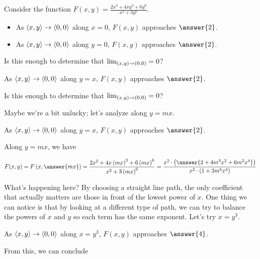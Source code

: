\documentclass{ximera}
\author{Jim Talamo}
\begin{document}
\begin{exercise}
  Consider the function $F(x,y)= \frac{2x^2+4xy^3+6y^6}{x^2+3y^6}$.
  
  \begin{itemize}
  \item As $\left\langle x,y\right\rangle \to \left\langle 0,0\right\rangle$ along $x=0$, $F(x,y)$ approaches $\answer{2}$.
  \item As $\left\langle x,y\right\rangle \to \left\langle 0,0\right\rangle$ along $y=0$, $F(x,y)$ approaches $\answer{2}$.
  \end{itemize}
  
Is this enough to determine that $\lim_{\left(x,y\right) \to \left(0,0\right)} = 0$? 
   
   \begin{exercise}
As $\left\langle x,y\right\rangle \to \left\langle 0,0\right\rangle$ along $y=x$, $F(x,y)$ approaches $\answer{2}$.
   
  Is this enough to determine that $\lim_{\left(x,y\right) \to \left(0,0\right)} = 0$? 
      
\begin{exercise}
Maybe we're a bit unlucky; let's analyze along $y=mx$.  

As $\left\langle x,y\right\rangle \to \left\langle 0,0\right\rangle$ along $y=x$, $F(x,y)$ approaches $\answer{2}$.

\begin{hint}
Along $y=mx$, we have 

\[
F(x,y)= F\left(x,\answer{mx}\right) = \frac{2x^2+4x\left(mx\right)^3+6\left(mx\right)^6}{x^2+3\left(mx\right)^6} = \frac{x^2 \cdot \left(\answer{2+4m^3x^2+6m^2x^4} \right) }{x^2 \cdot \left(1 +3m^6x^4 \right) }
\]
\end{hint}
\begin{exercise}

What's happening here?  By choosing a straight line path, the only coefficient that actually matters are those in front of the lowest power of $x$.  One thing we can notice is that by looking at a different type of path, we can try to balance the powers of $x$ and $y$ so each term has the same exponent.  Let's try $x=y^3$.

As $\left\langle x,y\right\rangle \to \left\langle 0,0\right\rangle$ along $x=y^3$, $F(x,y)$ approaches $\answer{4}$.

From this, we can conclude
\begin{multipleChoice}
\end{multipleChoice}


\end{exercise}
\end{exercise}
\end{exercise}
\end{exercise}
\end{document}
